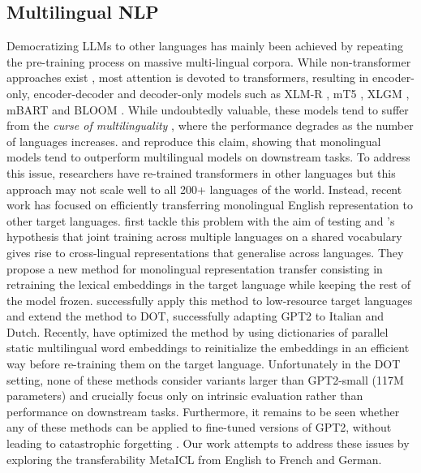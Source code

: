 \documentclass[11pt]{article}
\begin{document}
\subsection{Multilingual NLP}

Democratizing LLMs to other languages has mainly been achieved by repeating the pre-training process
on massive multi-lingual corpora. While non-transformer approaches exist
\citep{artetxe_massively_2019}, most attention is devoted to transformers, resulting in
encoder-only, encoder-decoder and decoder-only models such as XLM-R
\citep{conneau_cross-lingual_2019}, mT5 \citep{xue_mt5_2021}, XLGM \citep{lin_few-shot_2021}, mBART
\citep{liu_multilingual_2020} and BLOOM \citep{bigscience_workshop_bloom_2022}. While undoubtedly
valuable, these models tend to suffer from the \textit{curse of multilinguality}
\citep{conneau_unsupervised_2020}, where the performance degrades as the number of languages
increases. \citet{nozza_what_2020} and \citet{wu_are_2020} reproduce this claim, showing that
monolingual models tend to outperform multilingual models on downstream tasks. To address this
issue, researchers have re-trained transformers in other languages
\citep{martin_camembert_2020,de_vries_bertje_2019,chan_germans_2020, de_mattei_geppetto_2020} but
this approach may not scale well to all 200+ languages of the world. Instead, recent work has
focused on efficiently transferring monolingual English representation to other target languages.
\citet{artetxe_cross-lingual_2020} first tackle this problem with the aim of testing
\citet{pires_how_2019} and \citet{cao_multilingual_2022}'s hypothesis that joint training across
multiple languages on a shared vocabulary gives rise to cross-lingual representations that
generalise across languages. They propose a new method for monolingual representation transfer
consisting in retraining the lexical embeddings in the target language while keeping the rest of the
model frozen. \citet{de_vries_adapting_2021} successfully apply this method to low-resource target
languages and \citet{de_vries_as_2021} extend the method to DOT, successfully adapting GPT2 to
Italian and Dutch. Recently, \citet{minixhofer_wechsel_2022} have optimized the method by using
dictionaries of parallel static multilingual word embeddings to reinitialize the embeddings in an
efficient way before re-training them on the target language. Unfortunately in the DOT setting, none
of these methods consider variants larger than GPT2-small (117M parameters) and crucially focus only
on intrinsic evaluation rather than performance on downstream tasks. Furthermore, it remains to be
seen whether any of these methods can be applied to fine-tuned versions of GPT2, without leading to
catastrophic forgetting \citep{mccloskey_catastrophic_1989}. Our work attempts to address these
issues by exploring the transferability MetaICL \citep{min_metaicl_2022} from English to French and
German.
\end{document}
